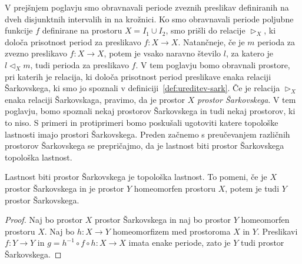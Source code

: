 \documentclass[../TG_magistrsko_delo_sections.tex]{subfiles}
\begin{document}
V prejšnjem poglavju smo obravnavali periode zveznih preslikav definiranih na dveh disjunktnih intervalih in na krožnici. Ko smo obravnavali periode poljubne funkcije $f$ definirane na prostoru $X = I_1 \cup I_2$, smo prišli do relacije $\triangleright_X$, ki določa prisotnost period za preslikavo $f : X \to X$. Natančneje, če je $m$ perioda za zvezno preslikavo $f:X \to X$, potem je vsako naravno število $l$, za katero je $l \triangleleft_X m$, tudi perioda za preslikavo $f$. V tem poglavju bomo obravnali prostore, pri katerih je relacija, ki določa prisotnost period preslikave enaka relaciji Šarkovskega, ki smo jo spoznali v definiciji~\ref{def:ureditev-sark}. Če je relacija $\triangleright_X$ enaka relaciji Šarkovskaga, pravimo, da je prostor $X$ \emph{prostor Šarkovskega}. V tem poglavju, bomo spoznali nekaj prostorov Šarkovskega in tudi nekaj prostorov, ki to niso. S primeri in protiprimeri bomo poskušali ugotoviti katere topološke lastnosti imajo prostori Šarkovskega.
Preden začnemo s preučevanjem različnih prostorov Šarkovskega se prepričajmo, da je lastnost biti prostor Šarkovskega topološka lastnost. 
\begin{trditev}
Lastnost biti prostor Šarkovskega je topološka lastnost. To pomeni, če je $X$ prostor Šarkovskega in je prostor $Y$ homeomorfen prostoru $X$, potem je tudi $Y$ prostor Šarkovskega.
\end{trditev}
\begin{proof}
Naj bo prostor $X$ prostor Šarkovskega in naj bo prostor $Y$ homeomorfen prostoru $X$. Naj bo $h : X \to Y$ homeomorfizem med prostoroma $X$ in $Y$. Preslikavi $f : Y \to Y$ in $g = h^{-1} \circ f \circ h : X \to X$ imata enake periode, zato je $Y$ tudi prostor Šarkovskega.
\end{proof}




\end{document}
